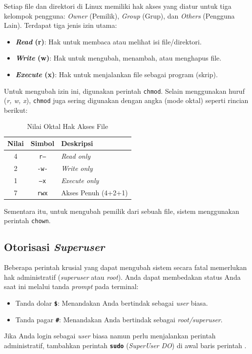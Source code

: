 Setiap file dan direktori di Linux memiliki hak akses yang diatur untuk tiga kelompok pengguna: \textit{Owner} (Pemilik), \textit{Group} (Grup), dan \textit{Others} (Pengguna Lain). Terdapat tiga jenis izin utama:
\begin{itemize}
    \item \textbf{\textit{Read} (r)}: Hak untuk membaca atau melihat isi file/direktori.
    \item \textbf{\textit{Write} (w)}: Hak untuk mengubah, menambah, atau menghapus file.
    \item \textbf{\textit{Execute} (x)}: Hak untuk menjalankan file sebagai program (skrip).
\end{itemize}

Untuk mengubah izin ini, digunakan perintah \texttt{chmod}. Selain menggunakan huruf (\textit{r, w, x}), \texttt{chmod} juga sering digunakan dengan angka (mode oktal) seperti rincian berikut:

\begin{table}[H]
    \caption{Nilai Oktal Hak Akses File}
    \label{tab:chmod-oktal}
    \centering
    \begin{tabular}{|c|c|l|}
        \hline
        \textbf{Nilai} & \textbf{Simbol} & \textbf{Deskripsi} \\ \hline
        4 & \texttt{r--} & \textit{Read only} \\ \hline
        2 & \texttt{-w-} & \textit{Write only} \\ \hline
        1 & \texttt{--x} & \textit{Execute only} \\ \hline
        7 & \texttt{rwx} & Akses Penuh (4+2+1) \\ \hline
    \end{tabular}
\end{table}

Sementara itu, untuk mengubah pemilik dari sebuah file, sistem menggunakan perintah \texttt{chown}.

\subsection{Otorisasi \textit{Superuser}}
Beberapa perintah krusial yang dapat mengubah sistem secara fatal memerlukan hak administratif (\textit{superuser} atau \textit{root}). Anda dapat membedakan status Anda saat ini melalui tanda \textit{prompt} pada terminal:
\begin{itemize}
    \item Tanda dolar \textbf{\texttt{\$}}: Menandakan Anda bertindak sebagai \textit{user} biasa.
    \item Tanda pagar \textbf{\texttt{\#}}: Menandakan Anda bertindak sebagai \textit{root/superuser}.
\end{itemize}
Jika Anda login sebagai \textit{user} biasa namun perlu menjalankan perintah administratif, tambahkan perintah \textbf{\texttt{sudo}} (\textit{SuperUser DO}) di awal baris perintah \cite{shotts2019linux}.

